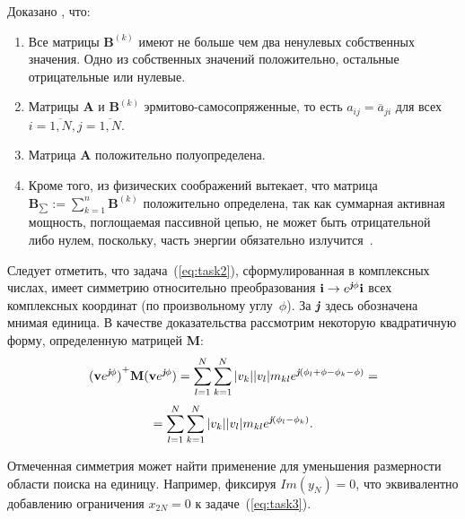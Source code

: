 Доказано \cite{yurkov:farkv}, что:
%
\begin{enumerate}
  \item Все матрицы $\textbf{B}^{(k)}$ имеют не больше чем два ненулевых собственных значения. Одно из собственных значений положительно,
  остальные отрицательные или нулевые.
  \item Матрицы $\textbf{A}$ и $\textbf{B}^{(k)}$ эрмитово-самосопряженные, то есть
  $a_{ij} = \overline{a}_{ji}$ для всех $i = \overline{1,N}, j = \overline{1,N}$.
  \item Матрица $\textbf{A}$ положительно полуопределена.
  \item Кроме того, из физических соображений вытекает, что матрица $\textbf{B}_{\sum}:= \sum_{k=1}^{n} \textbf{B}^{(k)}$
  положительно определена, так как суммарная активная мощность, поглощаемая пассивной цепью, не может быть отрицательной либо нулем,
  поскольку, часть энергии обязательно излучится~\cite{yurkov:farkv}.
\end{enumerate}

Следует отметить, что задача~(\ref{eq:task2}), сформулированная в комплексных числах, имеет симметрию относительно преобразования $\textbf{i} \to e^{\emph{\textbf{j}}\phi}\textbf{i}$ всех комплексных координат (по произвольному углу~$\phi$). За $\emph{\textbf{j}}$ здесь обозначена мнимая единица. В качестве доказательства рассмотрим некоторую квадратичную форму, определенную матрицей \textbf{M}: $${(\textbf{v}e^{\emph{\textbf{j}}\phi})}^{+}\textbf{M}(\textbf{v}e^{\emph{\textbf{j}}\phi}) =
\sum_{l=1}^{N}\sum_{k=1}^{N}|v_k||v_l|m_{kl}e^{\emph{\textbf{j}}(\phi_l + \phi - \phi_k - \phi)} =$$
$$ = \sum_{l=1}^{N}\sum_{k=1}^{N}|v_k||v_l|m_{kl}e^{\emph{\textbf{j}}(\phi_l - \phi_k)} .$$

Отмеченная симметрия может найти применение для уменьшения размерности области поиска на единицу. Например, фиксируя $Im(y_{N})=0$, что эквивалентно добавлению ограничения $x_{2N}=0$ к задаче~(\ref{eq:task3}).


